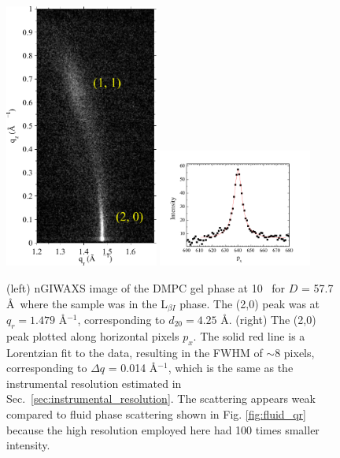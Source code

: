 \begin{figure}[htbp]
  \centering
  \includegraphics[trim=150 190 150 180,clip,width=0.45\textwidth]{figures/ripple/nGIWAXS/dmpc1_107}
  \includegraphics[trim=50 0 50 0,clip,width=0.45\textwidth]{figures/ripple/nGIWAXS/dmpc1_107_gel_phase_20_swath_8px}
  \caption[nGIWAXS of the DMPC gel phase]{(left) nGIWAXS image of the DMPC gel phase
  at 10 \textcelsius\ for $D$ = 57.7 \AA\ where the sample was in the 
  L$_{\beta I}$ phase. The (2,0) peak was at
  $q_r=1.479$ \AA$^{-1}$, corresponding to $d_{20}=4.25$ \AA.
  (right) The (2,0) peak plotted along horizontal pixels $p_x$. The solid red
  line is a Lorentzian fit to the data, resulting in the FWHM of $\sim$8 pixels,
  corresponding to $\Delta q$ = 0.014 \AA$^{-1}$,
  which is the same as the instrumental resolution estimated in Sec.~\ref{sec:instrumental_resolution}. The scattering appears weak compared to fluid phase scattering shown in Fig. \ref{fig:fluid_qr} because the high resolution employed here had 100 times smaller intensity.} 
  \label{fig:gel_phase}  
\end{figure}

